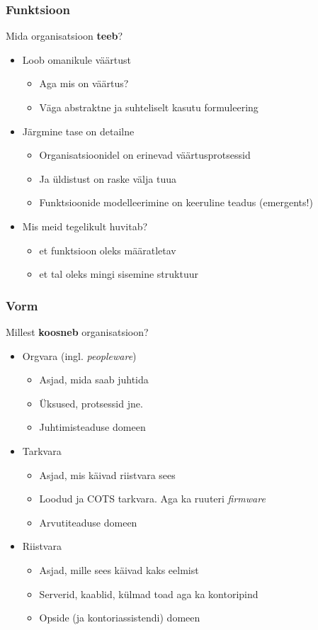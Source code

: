 \documentclass{beamer}
\begin{document}
\begin{frame}
	\frametitle{Funktsioon}
		Mida organisatsioon \textbf{teeb}?
			\begin{itemize}
				\item Loob omanikule väärtust
				\begin{itemize}
					\item Aga mis on väärtus?
					\item Väga abstraktne ja suhteliselt kasutu formuleering
				\end{itemize}
				\item Järgmine tase on detailne
				\begin{itemize}
					\item Organisatsioonidel on erinevad väärtusprotsessid
					\item Ja üldistust on raske välja tuua
					\item Funktsioonide modelleerimine on keeruline teadus (emergents!)
				\end{itemize}
				\item Mis meid tegelikult huvitab?
				\begin{itemize}
					\item et funktsioon oleks määratletav
					\item et tal oleks mingi sisemine struktuur
				\end{itemize}

			\end{itemize}
\end{frame}

\begin{frame}
	\frametitle{Vorm}
		Millest \textbf{koosneb} organisatsioon?
			\begin{itemize}
				\item Orgvara (ingl. \emph{peopleware})
				\begin{itemize}
					\item Asjad, mida saab juhtida
					\item Üksused, protsessid jne.
					\item Juhtimisteaduse domeen
				\end{itemize}
				\item Tarkvara
				\begin{itemize}
					\item Asjad, mis käivad riistvara sees
					\item Loodud ja COTS tarkvara. Aga ka ruuteri \emph{firmware}
					\item Arvutiteaduse domeen
				\end{itemize}
				\item Riistvara
				\begin{itemize}
					\item Asjad, mille sees käivad kaks eelmist
					\item Serverid, kaablid, külmad toad aga ka kontoripind
					\item Opside (ja kontoriassistendi) domeen
				\end{itemize}
			\end{itemize}
\end{frame}
\end{document}
